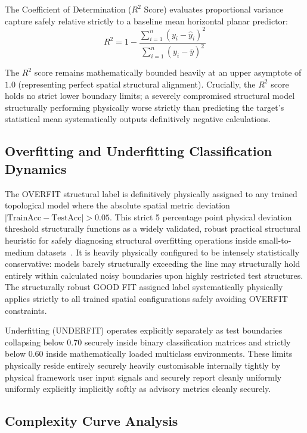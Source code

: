 \documentclass[conference]{IEEEtran}
\begin{document}
The Coefficient of Determination ($R^2$ Score) evaluates proportional variance capture safely relative strictly to a baseline mean horizontal planar predictor:
\begin{equation}
R^2 = 1 - \frac{\sum_{i=1}^n (y_i - \hat{y}_i)^2}{\sum_{i=1}^n (y_i - \bar{y})^2}
\end{equation}

The $R^2$ score remains mathematically bounded heavily at an upper asymptote of $1.0$ (representing perfect spatial structural alignment). Crucially, the $R^2$ score holds no strict lower boundary limits; a severely compromised structural model structurally performing physically worse strictly than predicting the target's statistical mean systematically outputs definitively negative calculations.

\subsection{Overfitting and Underfitting Classification Dynamics}

The OVERFIT structural label is definitively physically assigned to any trained topological model where the absolute spatial metric deviation $|\text{TrainAcc} - \text{TestAcc}| > 0.05$. This strict 5 percentage point physical deviation threshold structurally functions as a widely validated, robust practical structural heuristic for safely diagnosing structural overfitting operations inside small-to-medium datasets~\cite{b22}. It is heavily physically configured to be intensely statistically conservative: models barely structurally exceeding the line may structurally hold entirely within calculated noisy boundaries upon highly restricted test structures. The structurally robust GOOD FIT assigned label systematically physically applies strictly to all trained spatial configurations safely avoiding OVERFIT constraints.

Underfitting (UNDERFIT) operates explicitly separately as test boundaries collapsing below $0.70$ securely inside binary classification matrices and strictly below $0.60$ inside mathematically loaded multiclass environments. These limits physically reside entirely securely heavily customisable internally tightly by physical framework user input signals and securely report cleanly uniformly uniformly explicitly implicitly softly as advisory metrics cleanly securely.

\subsection{Complexity Curve Analysis}
\end{document}
